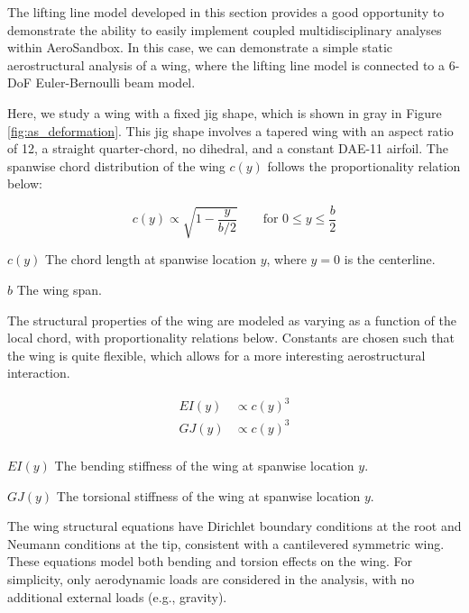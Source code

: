 The lifting line model developed in this section provides a good opportunity to demonstrate the ability to easily implement coupled multidisciplinary analyses within AeroSandbox. In this case, we can demonstrate a simple static aerostructural analysis of a wing, where the lifting line model is connected to a 6-DoF Euler-Bernoulli beam model.

Here, we study a wing with a fixed jig shape, which is shown in gray in Figure \ref{fig:as_deformation}. This jig shape involves a tapered wing with an aspect ratio of 12, a straight quarter-chord, no dihedral, and a constant DAE-11 airfoil. The spanwise chord distribution of the wing $c(y)$ follows the proportionality relation below:

\begin{equation}
c(y) \propto \sqrt{1 - \frac{y}{b/2}}\qquad \text{for } 0 \leq y \leq \frac{b}{2}
\end{equation}

\begin{eqexpl}
    \item{$c(y)$} The chord length at spanwise location $y$, where $y=0$ is the centerline.
    \item{$b$} The wing span.
\end{eqexpl}

The structural properties of the wing are modeled as varying as a function of the local chord, with proportionality relations below. Constants are chosen such that the wing is quite flexible, which allows for a more interesting aerostructural interaction.

\begin{equation}
    \begin{aligned}
        EI(y) &\propto c(y)^3 \\
        GJ(y) &\propto c(y)^3 \\
    \end{aligned}
\end{equation}

\begin{eqexpl}[30mm]
    \item{$EI(y)$} The bending stiffness of the wing at spanwise location $y$.
    \item{$GJ(y)$} The torsional stiffness of the wing at spanwise location $y$.
\end{eqexpl}

The wing structural equations have Dirichlet boundary conditions at the root and Neumann conditions at the tip, consistent with a cantilevered symmetric wing. These equations model both bending and torsion effects on the wing. For simplicity, only aerodynamic loads are considered in the analysis, with no additional external loads (e.g., gravity).

